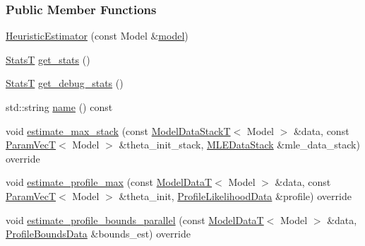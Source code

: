 \subsubsection*{Public Member Functions}
\begin{DoxyCompactItemize}
\item 
\hyperlink{classmappel_1_1estimator_1_1HeuristicEstimator_a9ef562f173e3482f0cc05967d7a73d48}{Heuristic\+Estimator} (const Model \&\hyperlink{classmappel_1_1estimator_1_1Estimator_a2f157410771fb79a20d4d54e505750d0}{model})
\item 
\hyperlink{namespacemappel_a04ab395b0cf82c4ce68a36b2212649a5}{StatsT} \hyperlink{classmappel_1_1estimator_1_1HeuristicEstimator_ae0e6e7e3db482278bae7115c7ec12c51}{get\+\_\+stats} ()
\item 
\hyperlink{namespacemappel_a04ab395b0cf82c4ce68a36b2212649a5}{StatsT} \hyperlink{classmappel_1_1estimator_1_1HeuristicEstimator_acc1b25bb059cddc89dcf7acd5f479a96}{get\+\_\+debug\+\_\+stats} ()
\item 
std\+::string \hyperlink{classmappel_1_1estimator_1_1HeuristicEstimator_ac1b16b1454a8f19b9abf22d3f6c8b123}{name} () const 
\item 
void \hyperlink{classmappel_1_1estimator_1_1ThreadedEstimator_a797b6479fbab450a42099cfdb07e900f}{estimate\+\_\+max\+\_\+stack} (const \hyperlink{namespacemappel_aaeb6665bc57476dd93c2df6ad8bc4768}{Model\+Data\+StackT}$<$ Model $>$ \&data, const \hyperlink{namespacemappel_a0f86d3153e4e27b095012f140eea58de}{Param\+VecT}$<$ Model $>$ \&theta\+\_\+init\+\_\+stack, \hyperlink{namespacemappel_1_1estimator_structmappel_1_1estimator_1_1MLEDataStack}{M\+L\+E\+Data\+Stack} \&mle\+\_\+data\+\_\+stack) override
\item 
void \hyperlink{classmappel_1_1estimator_1_1ThreadedEstimator_a16ce4964abd0e18da2f9ec7e8bd5b4ee}{estimate\+\_\+profile\+\_\+max} (const \hyperlink{namespacemappel_a97f050df953605381ae9c901c3b125f1}{Model\+DataT}$<$ Model $>$ \&data, const \hyperlink{namespacemappel_a0f86d3153e4e27b095012f140eea58de}{Param\+VecT}$<$ Model $>$ \&theta\+\_\+init, \hyperlink{namespacemappel_1_1estimator_structmappel_1_1estimator_1_1ProfileLikelihoodData}{Profile\+Likelihood\+Data} \&profile) override
\item 
void \hyperlink{classmappel_1_1estimator_1_1ThreadedEstimator_a518454a427336c48a83d145b917ec3f7}{estimate\+\_\+profile\+\_\+bounds\+\_\+parallel} (const \hyperlink{namespacemappel_a97f050df953605381ae9c901c3b125f1}{Model\+DataT}$<$ Model $>$ \&data, \hyperlink{structmappel_1_1estimator_1_1ProfileBoundsData}{Profile\+Bounds\+Data} \&bounds\+\_\+est) override

\end{DoxyCompactItemize}

